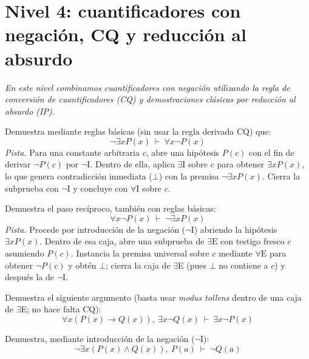 \section*{Nivel 4: cuantificadores con negación, CQ y reducción al absurdo}
\textit{En este nivel combinamos cuantificadores con negación utilizando la regla de conversión de cuantificadores (CQ) y demostraciones clásicas por reducción al absurdo (IP).}

\begin{pregunta}\label{e4-16}
Demuestra mediante reglas básicas (sin usar la regla derivada CQ) que:
\[
\neg \exists x P(x) \ \vdash \ \forall x \neg P(x)
\]
\textit{Pista.} Para una constante arbitraria $c$, abre una hipótesis $P(c)$ con el fin de derivar $\neg P(c)$ por $\neg\text{I}$. Dentro de ella, aplica $\exists\text{I}$ sobre $c$ para obtener $\exists x P(x)$, lo que genera contradicción inmediata ($\bot$) con la premisa $\neg \exists x P(x)$. Cierra la subprueba con $\neg\text{I}$ y concluye con $\forall\text{I}$ sobre $c$.
\end{pregunta}

\begin{pregunta}\label{e4-17}
Demuestra el paso recíproco, también con reglas básicas:
\[
\forall x \neg P(x) \ \vdash \ \neg \exists x P(x)
\]
\textit{Pista.} Procede por introducción de la negación ($\neg\text{I}$) abriendo la hipótesis $\exists x P(x)$. Dentro de esa caja, abre una subprueba de $\exists\text{E}$ con testigo fresco $c$ asumiendo $P(c)$. Instancia la premisa universal sobre $c$ mediante $\forall\text{E}$ para obtener $\neg P(c)$ y obtén $\bot$; cierra la caja de $\exists$E (pues $\bot$ no contiene a $c$) y después la de $\neg$I.
\end{pregunta}

\begin{pregunta}\label{e4-18}
Demuestra el siguiente argumento (basta usar \emph{modus tollens} dentro de una caja de $\exists$E; no hace falta CQ):
\[
\forall x (P(x) \to Q(x)), \ \exists x \neg Q(x) \ \vdash \ \exists x \neg P(x)
\]
\end{pregunta}

\begin{pregunta}\label{e4-19}
Demuestra, mediante introducción de la negación ($\neg$I):
\[
\neg \exists x (P(x) \land Q(x)), \ P(a) \ \vdash \ \neg Q(a)
\]
\end{pregunta}

